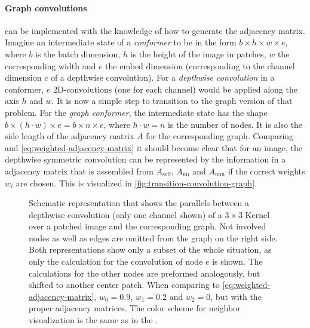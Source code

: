 \paragraph{Graph convolutions} can be implemented with the knowledge of how to generate the adjacency matrix.
Imagine an intermediate state of a \emph{conformer} to be in the form $b\times h\times w \times e$, where $b$ is the batch dimension, $h$ is the height of the image in patches, $w$ the corresponding width and $e$ the embed dimension (corresponding to the channel dimension $c$ of a depthwise convolution).
For a \emph{depthwise convolution} in a conformer, $e$ 2D-convolutions (one for each channel) would be applied along the axis $h$ and $w$. 
It is now a simple step to transition to the graph version of that problem.
For the \emph{graph conformer}, the intermediate state has the shape $b\times (h\cdot w) \times e = b\times n \times e$, where $h\cdot w = n$ is the number of nodes. 
It is also the side length of the adjacency matrix $A$ for the corresponding graph. 
Comparing %
and \autoref{eq:weighted-adjacency-matrix} it should become clear that for an image, the depthwise symmetric convolution can be represented by the information in a adjacency matrix that is assembled from $A_\mathrm{self}$, $A_\mathrm{nn}$ and $A_\mathrm{nnn}$ if the correct weights $w_i$ are chosen. This is visualized in \autoref{fig:transition-convolution-graph}.

\begin{figure}[htbp]
    \centering
    \caption{Schematic representation that shows the parallels between a depthwise convolution (only one channel shown) of a $3\times 3$ Kernel over a patched image and the corresponding graph. Not involved nodes as well as edges are omitted from the graph on the right side. Both representations show only a subset of the whole situation, as only the calculation for the convolution of node $e$ is shown. The calculations for the other nodes are preformed analogously, but shifted to another center patch. When comparing to \autoref{eq:weighted-adjacency-matrix}, $w_0=0.9$, $w_1=0.2$ and $w_2=0$, but with the proper adjacency matrices.
    The color scheme for neighbor visualization is the same as in the .}
    \label{fig:transition-convolution-graph}
\end{figure}

